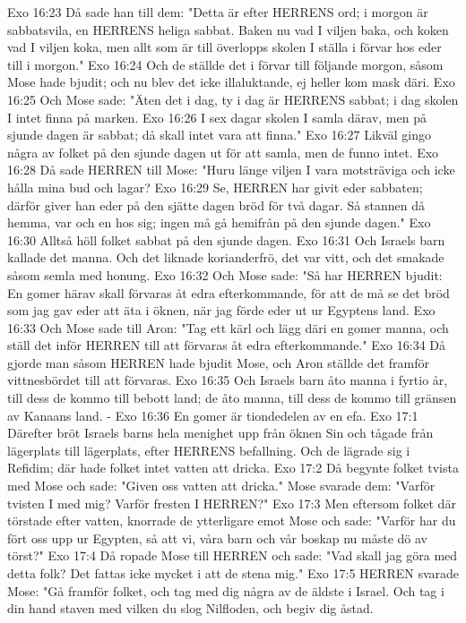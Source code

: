 Exo 16:23  Då sade han till dem: "Detta är efter HERRENS ord; i morgon är sabbatsvila, en HERRENS heliga sabbat. Baken nu vad I viljen baka, och koken vad I viljen koka, men allt som är till överlopps skolen I ställa i förvar hos eder till i morgon."
Exo 16:24  Och de ställde det i förvar till följande morgon, såsom Mose hade bjudit; och nu blev det icke illaluktande, ej heller kom mask däri.
Exo 16:25  Och Mose sade: "Äten det i dag, ty i dag är HERRENS sabbat; i dag skolen I intet finna på marken.
Exo 16:26  I sex dagar skolen I samla därav, men på sjunde dagen är sabbat; då skall intet vara att finna."
Exo 16:27  Likväl gingo några av folket på den sjunde dagen ut för att samla, men de funno intet.
Exo 16:28  Då sade HERREN till Mose: "Huru länge viljen I vara motsträviga och icke hålla mina bud och lagar?
Exo 16:29  Se, HERREN har givit eder sabbaten; därför giver han eder på den sjätte dagen bröd för två dagar. Så stannen då hemma, var och en hos sig; ingen må gå hemifrån på den sjunde dagen."
Exo 16:30  Alltså höll folket sabbat på den sjunde dagen.
Exo 16:31  Och Israels barn kallade det manna. Och det liknade korianderfrö, det var vitt, och det smakade såsom semla med honung.
Exo 16:32  Och Mose sade: "Så har HERREN bjudit: En gomer härav skall förvaras åt edra efterkommande, för att de må se det bröd som jag gav eder att äta i öknen, när jag förde eder ut ur Egyptens land.
Exo 16:33  Och Mose sade till Aron: "Tag ett kärl och lägg däri en gomer manna, och ställ det inför HERREN till att förvaras åt edra efterkommande."
Exo 16:34  Då gjorde man såsom HERREN hade bjudit Mose, och Aron ställde det framför vittnesbördet till att förvaras.
Exo 16:35  Och Israels barn åto manna i fyrtio år, till dess de kommo till bebott land; de åto manna, till dess de kommo till gränsen av Kanaans land. -
Exo 16:36  En gomer är tiondedelen av en efa.
Exo 17:1  Därefter bröt Israels barns hela menighet upp från öknen Sin och tågade från lägerplats till lägerplats, efter HERRENS befallning. Och de lägrade sig i Refidim; där hade folket intet vatten att dricka.
Exo 17:2  Då begynte folket tvista med Mose och sade: "Given oss vatten att dricka." Mose svarade dem: "Varför tvisten I med mig? Varför fresten I HERREN?"
Exo 17:3  Men eftersom folket där törstade efter vatten, knorrade de ytterligare emot Mose och sade: "Varför har du fört oss upp ur Egypten, så att vi, våra barn och vår boskap nu måste dö av törst?"
Exo 17:4  Då ropade Mose till HERREN och sade: "Vad skall jag göra med detta folk? Det fattas icke mycket i att de stena mig."
Exo 17:5  HERREN svarade Mose: "Gå framför folket, och tag med dig några av de äldste i Israel. Och tag i din hand staven med vilken du slog Nilfloden, och begiv dig åstad.
